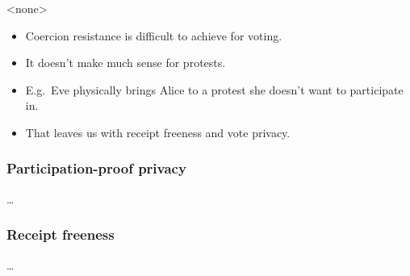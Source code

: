 \mode<none>{%
\begin{frame}
  \begin{remark}
    \begin{itemize}
      \item Coercion resistance is difficult to achieve for voting.
      \item It doesn't make much sense for protests.
      \item E.g.\ Eve physically brings Alice to a protest she doesn't want to 
        participate in.
      \item That leaves us with receipt freeness and vote privacy.
    \end{itemize}
  \end{remark}
\end{frame}
}

\subsubsection{Participation-proof privacy}

\begin{frame}
\begin{definition}
  \dots
\end{definition}
\end{frame}

\subsubsection{Receipt freeness}

\begin{frame}
\begin{definition}
  \dots
\end{definition}
\end{frame}

